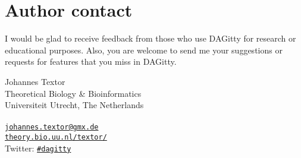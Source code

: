 \documentclass[a4paper,10pt]{article}
\newcommand{\pname}{{\sc DAG}itty\xspace}
\begin{document}
\section{Author contact}

I would be glad to receive feedback from those 
who use \pname for research or educational purposes. 
Also, you are welcome to send me your 
suggestions or requests for features that 
you miss in \pname. 

\bigskip

\noindent
Johannes Textor \\
Theoretical Biology \& Bioinformatics \\
Universiteit Utrecht, The Netherlands \\
\\
\href{mailto:johannes.textor@gmx.de}{\tt johannes.textor@gmx.de} \\
\href{http://theory.bio.uu.nl/textor/}{\tt theory.bio.uu.nl/textor/} \\
Twitter: \href{https://twitter.com/hashtag/dagitty}{\tt \#dagitty}

\bigskip



\end{document}
